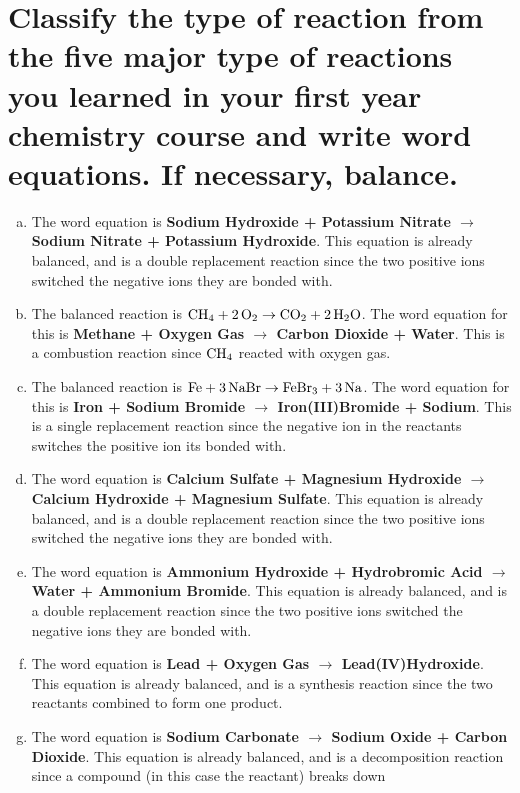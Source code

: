 \documentclass{scrartcl}
\begin{document}
\section{Classify the type of reaction from the five major type of reactions you learned in your first year chemistry course and write word equations. If necessary, balance.}
\label{sec:org20d3acf}
\begin{enumerate}[a.]
\item The word equation is \textbf{Sodium Hydroxide + Potassium Nitrate \(\rightarrow\) Sodium
Nitrate + Potassium Hydroxide}. This equation is already balanced, and is a
double replacement reaction since the two positive ions switched the negative
ions they are bonded with.
\item The balanced reaction is \(\ce{CH4 + 2O2}\rightarrow\ce{CO2 + 2H2O}\). The word
equation for this is \textbf{Methane + Oxygen Gas \(\rightarrow\) Carbon Dioxide + Water}.
This is a combustion reaction since \(\ce{CH4}\) reacted with oxygen gas.
\item The balanced reaction is \(\ce{Fe + 3NaBr}\rightarrow\ce{FeBr3 + 3Na}\). The word
equation for this is \textbf{Iron + Sodium Bromide \(\rightarrow\) Iron(III)Bromide +
Sodium}. This is a single replacement reaction since the negative ion in the
reactants switches the positive ion its bonded with.
\item The word equation is \textbf{Calcium Sulfate + Magnesium Hydroxide \(\rightarrow\)
Calcium Hydroxide + Magnesium Sulfate}. This equation is already balanced, and
is a double replacement reaction since the two positive ions switched the
negative ions they are bonded with.
\item The word equation is \textbf{Ammonium Hydroxide + Hydrobromic Acid \(\rightarrow\)
Water + Ammonium Bromide}. This equation is already balanced, and is a double
replacement reaction since the two positive ions switched the negative ions
they are bonded with.
\item The word equation is \textbf{Lead + Oxygen Gas \(\rightarrow\) Lead(IV)Hydroxide}. This
equation is already balanced, and is a synthesis reaction since the two
reactants combined to form one product.
\item The word equation is \textbf{Sodium Carbonate \(\rightarrow\) Sodium Oxide + Carbon
Dioxide}. This equation is already balanced, and is a decomposition reaction
since a compound (in this case the reactant) breaks down
\end{enumerate}
\end{document}
